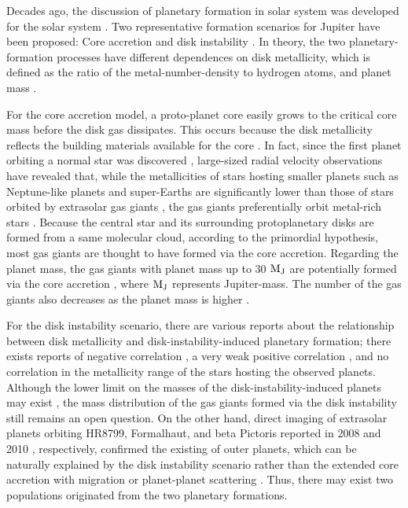 \documentclass[twocolumn, dvipdfmx]{aastex62}
\begin{document}
\begin{CJK*}{UTF8}{min}
Decades ago, the discussion of planetary formation in solar system was developed for the solar system \citep{1985prpl.conf.1100H}. Two representative formation scenarios for Jupiter have been proposed: Core accretion \citep{1974Icar...22..416P, 1980PThPh..64..544M, 1996Icar..124...62P} and disk instability \citep{1951PNAS...37....1K, 1997Sci...276.1836B, 2002Sci...298.1756M}. In theory, the two planetary-formation processes have different dependences on disk metallicity, which is defined as the ratio of the metal-number-density to hydrogen atoms, and planet mass \citep[e.g.,][]{2007ApJ...662.1282M}.

For the core accretion model, a proto-planet core easily grows to the critical core mass before the disk gas dissipates. This occurs because the disk metallicity reflects the building materials available for the core \citep{2004ApJ...616..567I, 2012A&A...541A..97M}. In fact, since the first planet orbiting a normal star was discovered \citep{1995Natur.378..355M}, large-sized radial velocity observations have revealed that, while the metallicities of stars hosting smaller planets such as Neptune-like planets and super-Earths are significantly lower than those of stars orbited by extrasolar gas giants \citep{2011arXiv1109.2497M, 2015AJ....149...14W}, the gas giants preferentially orbit metal-rich stars \citep[e.g.,][]{2003A&A...398..363S, 2005ApJ...622.1102F}. Because the central star and its surrounding protoplanetary disks are formed from a same molecular cloud, according to the primordial hypothesis, most gas giants are thought to have formed via the core accretion. Regarding the planet mass, the gas giants with planet mass up to 30 $\rm M_J$ are potentially formed via the core accretion \citep[e.g.,][]{2007ApJ...667..557T, 2016ApJ...823...48T}, where $\rm M_J$ represents Jupiter-mass. The number of the gas giants also decreases as the planet mass is higher \citep[e.g.,][]{2009A&A...501.1161M}.

For the disk instability scenario, there are various reports about the relationship between disk metallicity and disk-instability-induced planetary formation; there exists reports of negative correlation \citep{2006ApJ...636L.149C, 2007Arizona}, a very weak positive correlation \citep{2007ApJ...661L..77M}, and no correlation \citep{2002ApJ...567L.149B} in the metallicity range of the stars hosting the observed planets. Although the lower limit on the masses of the disk-instability-induced planets may exist \citep{2007ApJ...662.1282M}, the mass distribution of the gas giants formed via the disk instability still remains an open question. On the other hand, direct imaging of extrasolar planets orbiting HR8799, Formalhaut, and beta Pictoris reported in 2008 and 2010 \citep{2008Sci...322.1348M, 2008Sci...322.1345K, 2010Sci...329...57L}, respectively, confirmed the existing of outer planets, which can be naturally explained by the disk instability scenario rather than the extended core accretion with migration or planet-planet scattering \citep{2009ApJ...707...79D}. Thus, there may exist two populations originated from the two planetary formations.


\end{CJK*}
\end{document}
